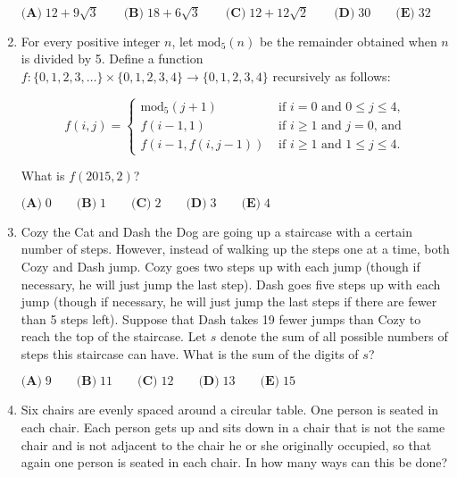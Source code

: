 \documentclass{article}
\begin{document}
\begin{enumerate}[label=\arabic*., itemsep=0.5em]
$\textbf{(A)}\; 12+9\sqrt{3} \qquad\textbf{(B)}\; 18+6\sqrt{3} \qquad\textbf{(C)}\; 12+12\sqrt{2} \qquad\textbf{(D)}\; 30 \qquad\textbf{(E)}\; 32$\par \vspace{0.5em}\item For every positive integer $n$, let $\text{mod}_5 (n)$ be the remainder obtained when $n$ is divided by 5. Define a function $f: \{0,1,2,3,\dots\} \times \{0,1,2,3,4\} \to \{0,1,2,3,4\}$ recursively as follows:


\begin{equation*}
f(i,j) = \begin{cases}\text{mod}_5 (j+1) & \text{ if } i = 0 \text{ and } 0 \le j \le 4 \text{,}\\
f(i-1,1) & \text{ if } i \ge 1 \text{ and } j = 0 \text{, and} \\
f(i-1, f(i,j-1)) & \text{ if } i \ge 1 \text{ and } 1 \le j \le 4.
\end{cases}
\end{equation*}
  

What is $f(2015,2)$?

$\textbf{(A)}\; 0 \qquad\textbf{(B)}\; 1 \qquad\textbf{(C)}\; 2 \qquad\textbf{(D)}\; 3 \qquad\textbf{(E)}\; 4$\par \vspace{0.5em}\item Cozy the Cat and Dash the Dog are going up a staircase with a certain number of steps. However, instead of walking up the steps one at a time, both Cozy and Dash jump. Cozy goes two steps up with each jump (though if necessary, he will just jump the last step). Dash goes five steps up with each jump (though if necessary, he will just jump the last steps if there are fewer than 5 steps left). Suppose that Dash takes 19 fewer jumps than Cozy to reach the top of the staircase. Let $s$ denote the sum of all possible numbers of steps this staircase can have. What is the sum of the digits of $s$?

$\textbf{(A)}\; 9 \qquad\textbf{(B)}\; 11 \qquad\textbf{(C)}\; 12 \qquad\textbf{(D)}\; 13 \qquad\textbf{(E)}\; 15$\par \vspace{0.5em}\item Six chairs are evenly spaced around a circular table. One person is seated in each chair. Each person gets up and sits down in a chair that is not the same chair and is not adjacent to the chair he or she originally occupied, so that again one person is seated in each chair. In how many ways can this be done?


\end{enumerate}
\end{document}
